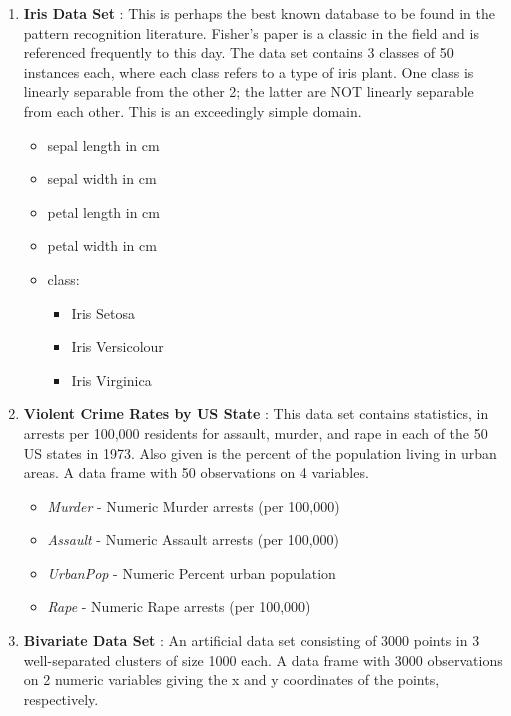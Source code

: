 \begin{enumerate}
\item \textbf{Iris Data Set} : This is perhaps the best known database to be found in the pattern recognition literature.
Fisher's paper is a classic in the field and is referenced frequently to this day. The data set contains 3 classes of 50
instances each, where each class refers to a type of iris plant. One class is linearly separable from the other 2;
the latter are NOT linearly separable from each other. This is an exceedingly simple domain.

\begin{itemize}
\item sepal length in cm
\item sepal width in cm
\item petal length in cm
\item petal width in cm
\item class:
\begin{itemize}
\item Iris Setosa
\item Iris Versicolour
\item Iris Virginica
\end{itemize}
\end{itemize}

\item \textbf{Violent Crime Rates by US State} : This data set contains statistics, in arrests per 100,000 residents for assault, murder,
and rape in each of the 50 US states in 1973. Also given is the percent of the population living in urban areas.
A data frame with 50 observations on 4 variables.
\begin{itemize}
\item	\textit{Murder} -	Numeric	Murder arrests (per 100,000)
\item	\textit{Assault} - Numeric	Assault arrests (per 100,000)
\item	\textit{UrbanPop} -	Numeric	Percent urban population
\item	\textit{Rape} - Numeric	Rape arrests (per 100,000)
\end{itemize}

\item \textbf{Bivariate Data Set} : An artificial data set consisting of 3000 points
in 3 well-separated clusters of size 1000 each. A data frame with 3000 observations on
2 numeric variables giving the x and y coordinates of the points, respectively.


\end{enumerate}
